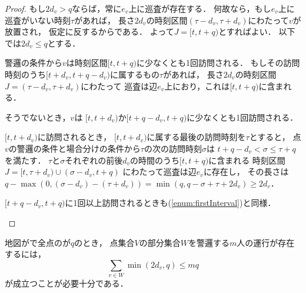 \begin{proof}
  もし$2d_v > q$ならば，常に$e _v$上に巡査が存在する．
  何故なら，もし$e_v$上に巡査がいない時刻$\tau$があれば，
  長さ$2d_v$の時刻区間$(\tau - d _v, \tau + d _v)$にわたって$v$が放置され，
  仮定に反するからである．
  よって$J =[t, t + q)$とすればよい．
  以下では$2d_v \leq q$とする．

  警邏の条件から$v$は時刻区間$[t, t + q)$に少なくとも1回訪問される．
  もしその訪問時刻のうち$[t + d_v, t + q - d_v)$に属するもの$\tau$があれば，
  長さ$2 d _v$の時刻区間$J = (\tau - d _v, \tau + d _v)$にわたって
  巡査は辺$e_v$上におり，これは$[t, t + q)$に含まれる．

  そうでないとき，$v$は
  $[t, t + d_v)$か$[t + q - d_v, t + q)$に少なくとも1回訪問される．
  \begin{inparaenum}[(i)]
    \item $[t, t + d_v)$に訪問されるとき，
      $[t, t + d_v)$に属する最後の訪問時刻を$\tau$とすると，
      点$v$の警邏の条件と場合分けの条件から$\tau$の次の訪問時刻$\sigma$は
      $t + q - d_v < \sigma \leq \tau + q$を満たす．
      $\tau$と$\sigma$それぞれの前後$d_v$の時間のうち$[t, t + q)$に含まれる
      時刻区間$J = [t, \tau + d_v) \cup (\sigma - d_v, t + q)$%
      にわたって巡査は辺$e_v$に存在し，
      その長さは
      $q - \max(0, (\sigma - d_v) - (\tau + d_v))
        = \min(q, q - \sigma + \tau + 2d_v)
        \geq 2d_v$．
      \label{enum:firstInterval}
    \item $[t + q - d_v, t + q)$に1回以上訪問されるときも(\ref{enum:firstInterval})と同様．
    \qedhere
  \end{inparaenum}
\end{proof}


\begin{lemm}
  \label{lemm:StarConditionOfGuarding}
  地図が{\graphStar}で全点の{\maxIdletime}が$q$のとき，
  点集合$V$の部分集合$W$を警邏する$m$人の運行が存在するには，
  \begin{equation}
    \label{equation: star bound}
    \sum_{v \in W} \min(2d_v, q) \leq mq
  \end{equation}
  が成立つことが必要十分である．
\end{lemm}


